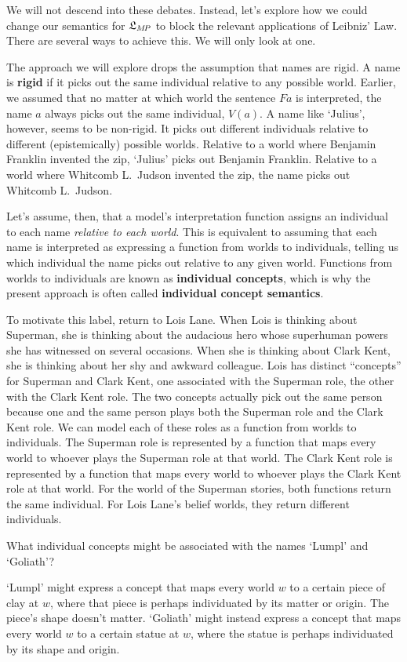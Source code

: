We will not descend into these debates. Instead, let's explore how we could
change our semantics for $\mathfrak{L}_{M\!P}$ to block the relevant applications of
Leibniz' Law. There are several ways to achieve this. We will only look at one.

The approach we will explore drops the assumption that names are rigid. A name
is \textbf{rigid} if it picks out the same individual relative to any possible
world. Earlier, we assumed that no matter at which world the sentence $Fa$ is
interpreted, the name $a$ always picks out the same individual, $V(a)$. A name
like `Julius', however, seems to be non-rigid. It picks out different
individuals relative to different (epistemically) possible worlds. Relative to a
world where Benjamin Franklin invented the zip, `Julius' picks out Benjamin
Franklin. Relative to a world where Whitcomb L.\ Judson invented the zip, the
name picks out Whitcomb L.\ Judson.

Let's assume, then, that a model's interpretation function assigns an individual
to each name \emph{relative to each world}. This is equivalent to assuming that
each name is interpreted as expressing a function from worlds to individuals,
telling us which individual the name picks out relative to any given world.
Functions from worlds to individuals are known as \textbf{individual concepts},
which is why the present approach is often called \textbf{individual concept
  semantics}.

To motivate this label, return to Lois Lane. When Lois is thinking about
Superman, she is thinking about the audacious hero whose superhuman powers she
has witnessed on several occasions. When she is thinking about Clark Kent, she
is thinking about her shy and awkward colleague. Lois has distinct ``concepts''
for Superman and Clark Kent, one associated with the Superman role, the other
with the Clark Kent role. The two concepts actually pick out the same person
because one and the same person plays both the Superman role and the Clark Kent
role. We can model each of these roles as a function from worlds to individuals.
The Superman role is represented by a function that maps every world to whoever
plays the Superman role at that world. The Clark Kent role is represented by a
function that maps every world to whoever plays the Clark Kent role at that
world. For the world of the Superman stories, both functions return the same
individual. For Lois Lane's belief worlds, they return different individuals.

\begin{exercise}
  What individual concepts might be associated with the names `Lumpl' and
  `Goliath'?
\end{exercise}
\begin{solution}
  `Lumpl' might express a concept that maps every world $w$ to a certain piece
  of clay at $w$, where that piece is perhaps individuated by its matter or
  origin. The piece's shape doesn't matter. `Goliath' might instead express a concept that maps every world $w$ to a certain statue at $w$, where the statue is perhaps individuated by its shape and origin.
\end{solution}

